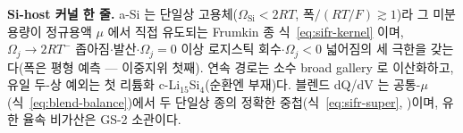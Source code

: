 \begin{keybox}
\textbf{Si-host 커널 한 줄.} a-Si 는 단일상 고용체($\Omega_\mathrm{Si}<2RT$, 폭$/(RT/F)\gtrsim1$)라 그
미분용량이 정규용액 $\mu$ 에서 직접 유도되는 Frumkin 종 식~\eqref{eq:sifr-kernel} 이며, $\Omega_j\to2RT^-$
좁아짐$\cdot$발산$\cdot$$\Omega_j{=}0$ 이상 로지스틱 회수$\cdot$$\Omega_j<0$ 넓어짐의 세 극한을 갖는다(폭은
평형 예측 --- 이중지위 첫째). 연속 경로는 소수 broad gallery 로 이산화하고, 유일 두-상 예외는 첫 리튬화
c-Li$_{15}$Si$_4$(순환엔 부재)다. 블렌드 dQ/dV 는 공통-$\mu$(식~\eqref{eq:blend-balance})에서 두 단일상
종의 정확한 중첩(식~\eqref{eq:sifr-super}, \cite{tu_blend2024})이며, 유한 율속 비가산은 GS-2 소관이다.
\end{keybox}

